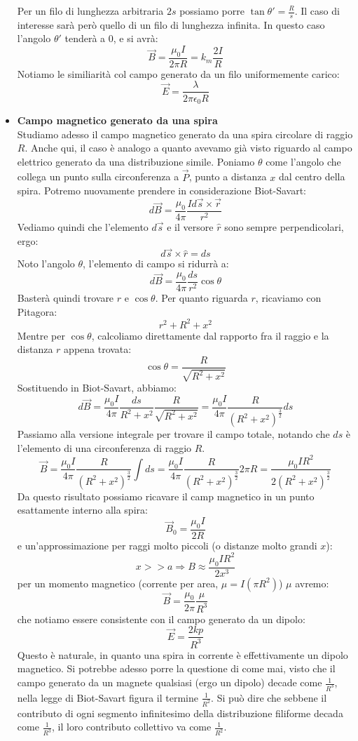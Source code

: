 \documentclass[a4paper,12pt]{article}
\begin{document}
\begin{itemize}
    Per un filo di lunghezza arbitraria $2s$ possiamo porre $\tan{\theta'} = \frac{R}{s}$. Il caso di interesse sarà però quello
    di un filo di lunghezza infinita. In questo caso l'angolo $\theta'$ tenderà a $0$, e si avrà:
    $$ \vec{B} = \frac{\mu_0I}{2\pi R} = k_m \frac{2I}{R}$$
    Notiamo le similiarità col campo generato da un filo uniformemente carico:
    $$ \vec{E} = \frac{\lambda}{2\pi\epsilon_0 R} $$
  \item \textbf{Campo magnetico generato da una spira} \\
    Studiamo adesso il campo magnetico generato da una spira circolare di raggio $R$. Anche qui, il caso è analogo a quanto avevamo già visto riguardo
    al campo elettrico generato da una distribuzione simile. Poniamo $\theta$ come l'angolo che collega un punto sulla circonferenza a $\vec{P}$, punto a distanza
    $x$ dal centro della spira. Potremo nuovamente prendere in considerazione Biot-Savart:
    $$ d\vec{B} = \frac{\mu_0}{4\pi} \frac{Id\vec{s} \times \vec{r}}{r^2} $$
    Vediamo quindi che l'elemento $d\vec{s}$ e il versore $\hat{r}$ sono sempre perpendicolari, ergo:
    $$ d\vec{s} \times \hat{r} = ds $$
    Noto l'angolo $\theta$, l'elemento di campo si ridurrà a:
    $$ d\vec{B} = \frac{\mu_0}{4\pi} \frac{ds}{r^2}\cos{\theta} $$
    Basterà quindi trovare $r$ e $\cos{\theta}$. Per quanto riguarda $r$, ricaviamo con Pitagora:
    $$ r^2 + R^2 + x^2 $$
    Mentre per $\cos{\theta}$, calcoliamo direttamente dal rapporto fra il raggio e la distanza $r$ appena trovata:
    $$ \cos{\theta} = \frac{R}{\sqrt{R^2 + x^2}} $$
    Sostituendo in Biot-Savart, abbiamo:
    $$ d\vec{B} = \frac{\mu_0 I}{4\pi} \frac{ds}{R^2 + x^2} \frac{R}{\sqrt{R^2+x^2}} = \frac{\mu_0I}{4\pi} \frac{R}{(R^2+x^2)^{\frac{3}{2}}}ds $$
    Passiamo alla versione integrale per trovare il campo totale, notando che $ds$ è l'elemento di una circonferenza di raggio $R$.
    $$ \vec{B} = \frac{\mu_0I}{4\pi} \frac{R}{(R^2+x^2)^{\frac{3}{2}}}\int ds = \frac{\mu_0I}{4\pi} \frac{R}{(R^2+x^2)^{\frac{3}{2}}} 2\pi R = \frac{\mu_0IR^2}{2(R^2+x^2)^{\frac{3}{2}}} $$
    Da questo risultato possiamo ricavare il camp magnetico in un punto esattamente interno alla spira:
    $$ \vec{B}_0 = \frac{\mu_0I}{2R} $$
    e un'approssimazione per raggi molto piccoli (o distanze molto grandi $x$):
    $$ x >> a \Rightarrow B \approx \frac{\mu_0IR^2}{2x^3} $$
    per un momento magnetico (corrente per area, $\mu = I(\pi R^2)$) $\mu$ avremo:
    $$ \vec{B} = \frac{\mu_0}{2\pi} \frac{\mu}{R^3}$$
    che notiamo essere consistente con il campo generato da un dipolo:
    $$ \vec{E} = \frac{2kp}{R^3} $$
    Questo è naturale, in quanto una spira in corrente è effettivamente un dipolo magnetico. Si potrebbe
    adesso porre la questione di come mai, visto che il campo generato da un magnete qualsiasi (ergo un dipolo) decade
    come $\frac{1}{R^3}$, nella legge di Biot-Savart figura il termine $\frac{1}{R^2}$. Si può dire che sebbene il contributo
    di ogni segmento infinitesimo della distribuzione filiforme decada come $\frac{1}{R^3}$, il loro contributo collettivo va
    come $\frac{1}{R^2}$.
\end{itemize} 
\end{document}
